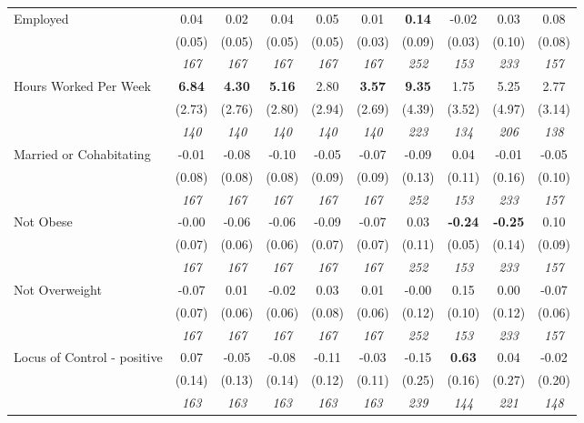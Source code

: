 \begin{tabular}{l c c c c c c c c c}
Employed & 0.04 & 0.02 & 0.04 & 0.05 & 0.01 & \textbf{ 0.14 } & -0.02 & 0.03 & 0.08 \\
& (0.05) & (0.05) & (0.05) & (0.05) & (0.03) & (0.09) & (0.03) & (0.10) & (0.08) \\
& \textit{ 167 } & \textit{ 167 } & \textit{ 167 } & \textit{ 167 } & \textit{ 167 } & \textit{ 252 } & \textit{ 153 } & \textit{ 233 } & \textit{ 157 } \\
Hours Worked Per Week & \textbf{ 6.84 } & \textbf{ 4.30 } & \textbf{ 5.16 } & 2.80 & \textbf{3.57} & \textbf{ 9.35 } & 1.75 & 5.25 & 2.77 \\
& (2.73) & (2.76) & (2.80) & (2.94) & (2.69) & (4.39) & (3.52) & (4.97) & (3.14) \\
& \textit{ 140 } & \textit{ 140 } & \textit{ 140 } & \textit{ 140 } & \textit{ 140 } & \textit{ 223 } & \textit{ 134 } & \textit{ 206 } & \textit{ 138 } \\
Married or Cohabitating & -0.01 & -0.08 & -0.10 & -0.05 & -0.07 & -0.09 & 0.04 & -0.01 & -0.05 \\
& (0.08) & (0.08) & (0.08) & (0.09) & (0.09) & (0.13) & (0.11) & (0.16) & (0.10) \\
& \textit{ 167 } & \textit{ 167 } & \textit{ 167 } & \textit{ 167 } & \textit{ 167 } & \textit{ 252 } & \textit{ 153 } & \textit{ 233 } & \textit{ 157 } \\
Not Obese & -0.00 & -0.06 & -0.06 & -0.09 & -0.07 & 0.03 & \textbf{-0.24} & \textbf{ -0.25 } & 0.10 \\
& (0.07) & (0.06) & (0.06) & (0.07) & (0.07) & (0.11) & (0.05) & (0.14) & (0.09) \\
& \textit{ 167 } & \textit{ 167 } & \textit{ 167 } & \textit{ 167 } & \textit{ 167 } & \textit{ 252 } & \textit{ 153 } & \textit{ 233 } & \textit{ 157 } \\
Not Overweight & -0.07 & 0.01 & -0.02 & 0.03 & 0.01 & -0.00 & 0.15 & 0.00 & -0.07 \\
& (0.07) & (0.06) & (0.06) & (0.08) & (0.06) & (0.12) & (0.10) & (0.12) & (0.06) \\
& \textit{ 167 } & \textit{ 167 } & \textit{ 167 } & \textit{ 167 } & \textit{ 167 } & \textit{ 252 } & \textit{ 153 } & \textit{ 233 } & \textit{ 157 } \\
Locus of Control - positive & 0.07 & -0.05 & -0.08 & -0.11 & -0.03 & -0.15 & \textbf{0.63} & 0.04 & -0.02 \\
& (0.14) & (0.13) & (0.14) & (0.12) & (0.11) & (0.25) & (0.16) & (0.27) & (0.20) \\
& \textit{ 163 } & \textit{ 163 } & \textit{ 163 } & \textit{ 163 } & \textit{ 163 } & \textit{ 239 } & \textit{ 144 } & \textit{ 221 } & \textit{ 148 } \\

\end{tabular}
